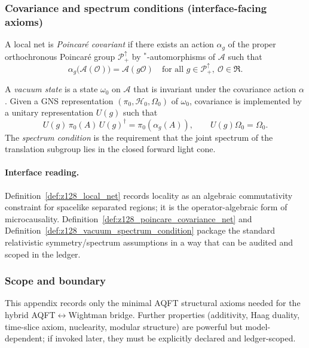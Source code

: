 \subsubsection{Covariance and spectrum conditions (interface-facing axioms)}
\begin{definition}
\label{def:z128_poincare_covariance_net}
A local net is \emph{Poincar\'e covariant} if there exists an action $\alpha_g$ of the proper orthochronous Poincar\'e group $\mathcal{P}^\uparrow_+$ by $^\ast$-automorphisms of $\mathcal{A}$ such that
\[
\alpha_g\bigl(\mathcal{A}(\mathcal{O})\bigr)=\mathcal{A}(g\mathcal{O})
\quad\text{for all }g\in\mathcal{P}^\uparrow_+,\ \mathcal{O}\in\mathfrak{R}.
\]
\end{definition}

\begin{definition}
\label{def:z128_vacuum_spectrum_condition}
A \emph{vacuum state} is a state $\omega_0$ on $\mathcal{A}$ that is invariant under the covariance action $\alpha$.
Given a GNS representation $(\pi_0,\mathcal{H}_0,\Omega_0)$ of $\omega_0$, covariance is implemented by a unitary representation $U(g)$ such that
\[
U(g)\,\pi_0(A)\,U(g)^\dagger=\pi_0(\alpha_g(A)),
\qquad
U(g)\Omega_0=\Omega_0.
\]
The \emph{spectrum condition} is the requirement that the joint spectrum of the translation subgroup lies in the closed forward light cone.
\end{definition}

\paragraph{Interface reading.}
\InterfaceTag Definition~\ref{def:z128_local_net} records locality as an algebraic commutativity constraint for spacelike separated regions; it is the operator-algebraic form of microcausality.
Definition~\ref{def:z128_poincare_covariance_net} and Definition~\ref{def:z128_vacuum_spectrum_condition} package the standard relativistic symmetry/spectrum assumptions in a way that can be audited and scoped in the ledger.

\subsubsection{Scope and boundary}
\AuditTag This appendix records only the minimal AQFT structural axioms needed for the hybrid AQFT$\leftrightarrow$Wightman bridge.
Further properties (additivity, Haag duality, time-slice axiom, nuclearity, modular structure) are powerful but model-dependent; if invoked later, they must be explicitly declared and ledger-scoped.
